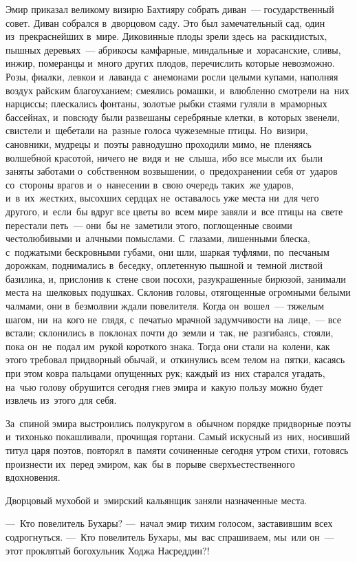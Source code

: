 \documentclass[12pt,a4paper]{book}
\begin{document}
Эмир приказал великому визирю Бахтияру собрать диван~— государственный совет. Диван собрался в~дворцовом саду. Это был замечательный сад, один из~прекраснейших в~мире. Диковинные плоды зрели здесь на~раскидистых, пышных деревьях~— абрикосы камфарные, миндальные и~хорасанские, сливы, инжир, померанцы и~много других плодов, перечислить которые невозможно. Розы, фиалки, левкои и~лаванда с~анемонами росли целыми купами, наполняя воздух райским благоуханием; смеялись ромашки, и~влюбленно смотрели на~них нарциссы; плескались фонтаны, золотые рыбки стаями гуляли в~мраморных бассейнах, и~повсюду были развешаны серебряные клетки, в~которых звенели, свистели и~щебетали на~разные голоса чужеземные птицы. Но~визири, сановники, мудрецы и~поэты равнодушно проходили мимо, не~пленяясь волшебной красотой, ничего не~видя и~не~слыша, ибо все мысли их~были заняты заботами о~собственном возвышении, о~предохранении себя от~ударов со~стороны врагов и~о~нанесении в~свою очередь таких~же ударов, и~в~их~жестких, высохших сердцах не~оставалось уже места ни~для чего другого, и~если~бы вдруг все цветы во~всем мире завяли и~все птицы на~свете перестали петь~— они~бы не~заметили этого, поглощенные своими честолюбивыми и~алчными помыслами. С~глазами, лишенными блеска, с~поджатыми бескровными губами, они шли, шаркая туфлями, по~песчаным дорожкам, поднимались в~беседку, оплетенную пышной и~темной листвой базилика, и, прислонив к~стене свои посохи, разукрашенные бирюзой, занимали места на~шелковых подушках. Склонив головы, отягощенные огромными белыми чалмами, они в~безмолвии ждали повелителя. Когда он~вошел~— тяжелым шагом, ни~на~кого не~глядя, с~печатью мрачной задумчивости на~лице,~— все встали; склонились в~поклонах почти до~земли и~так, не~разгибаясь, стояли, пока он~не~подал им~рукой короткого знака. Тогда они стали на~колени, как этого требовал придворный обычай, и~откинулись всем телом на~пятки, касаясь при этом ковра пальцами опущенных рук; каждый из~них старался угадать, на~чью голову обрушится сегодня гнев эмира и~какую пользу можно будет извлечь из~этого для себя.

За~спиной эмира выстроились полукругом в~обычном порядке придворные поэты и~тихонько покашливали, прочищая гортани. Самый искусный из~них, носивший титул царя поэтов, повторял в~памяти сочиненные сегодня утром стихи, готовясь произнести их~перед эмиром, как~бы в~порыве сверхъестественного вдохновения.

Дворцовый мухобой и~эмирский кальянщик заняли назначенные места.

—~Кто повелитель Бухары? —~начал эмир тихим голосом, заставившим всех содрогнуться. —~Кто повелитель Бухары, мы~вас спрашиваем, мы~или он~— этот проклятый богохульник Ходжа Насреддин?!
\end{document}
